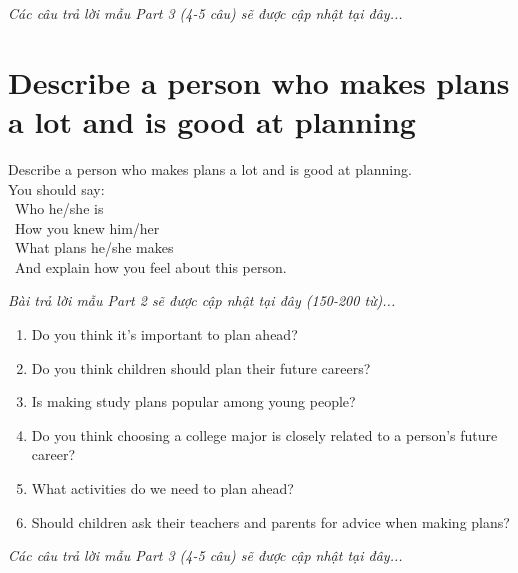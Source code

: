 \vspace{1em}
\textit{Các câu trả lời mẫu Part 3 (4-5 câu) sẽ được cập nhật tại đây...}
\vspace{2em}

\section{Describe a person who makes plans a lot and is good at planning}
\begin{ieltsprompt}
Describe a person who makes plans a lot and is good at planning. \\
You should say: \\
\textbullet\ Who he/she is \\
\textbullet\ How you knew him/her \\
\textbullet\ What plans he/she makes \\
\textbullet\ And explain how you feel about this person. \\
\end{ieltsprompt}

\vspace{1em}
\textit{Bài trả lời mẫu Part 2 sẽ được cập nhật tại đây (150-200 từ)...}
\vspace{2em}

\begin{ieltsprompt}
\begin{enumerate}[itemsep=4pt]
    \item Do you think it's important to plan ahead?
    \item Do you think children should plan their future careers?
    \item Is making study plans popular among young people?
    \item Do you think choosing a college major is closely related to a person's future career?
    \item What activities do we need to plan ahead?
    \item Should children ask their teachers and parents for advice when making plans?
\end{enumerate}
\end{ieltsprompt}

\vspace{1em}
\textit{Các câu trả lời mẫu Part 3 (4-5 câu) sẽ được cập nhật tại đây...}
\vspace{2em}

